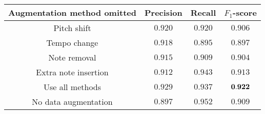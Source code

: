 \begin{tabular}{cccc}
    \textbf{Augmentation method omitted} & Precision & Recall  & $F_1$-score   \\\hline
    Pitch shift                          & $0.920$   & $0.920$ & $0.906$       \\
    Tempo change                         & $0.918$   & $0.895$ & $0.897$       \\
    Note removal                         & $0.915$   & $0.909$ & $0.904$       \\
    Extra note insertion                 & $0.912$   & $0.943$ & $0.913$       \\
    Use all methods                      & $0.929$   & $0.937$ & ${\bf 0.922}$ \\
    No data augmentation                 & $0.897$   & $0.952$ & $0.909$
\end{tabular}
